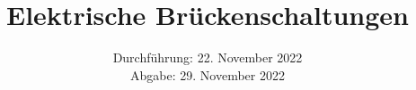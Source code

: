 

\subject{\texorpdfstring{\vspace{2ex}}{}302\texorpdfstring{\vspace{-2ex}}{}} %
\title{Elektrische Brückenschaltungen} %
\date{
	Durchführung: 22. November 2022 %
	\\[0.5ex] Abgabe: 29. November 2022 %
}



\maketitle
{}

\thispagestyle{empty}
\tableofcontents
\newpage






\printbibliography{}


